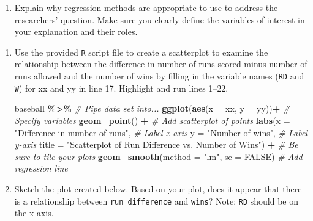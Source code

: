 \documentclass[
]{report}
\newenvironment{Shaded}{\begin{snugshade}}{\end{snugshade}}
\newcommand{\CommentTok}[1]{\textcolor[rgb]{0.56,0.35,0.01}{\textit{#1}}}
\newcommand{\DataTypeTok}[1]{\textcolor[rgb]{0.13,0.29,0.53}{#1}}
\newcommand{\KeywordTok}[1]{\textcolor[rgb]{0.13,0.29,0.53}{\textbf{#1}}}
\newcommand{\NormalTok}[1]{#1}
\newcommand{\OperatorTok}[1]{\textcolor[rgb]{0.81,0.36,0.00}{\textbf{#1}}}
\newcommand{\OtherTok}[1]{\textcolor[rgb]{0.56,0.35,0.01}{#1}}
\newcommand{\StringTok}[1]{\textcolor[rgb]{0.31,0.60,0.02}{#1}}
\providecommand{\tightlist}{%
  \setlength{\itemsep}{0pt}\setlength{\parskip}{0pt}}
\begin{document}
\begin{enumerate}
\def\labelenumi{\arabic{enumi}.}
\tightlist
\item
  Explain why regression methods are appropriate to use to address the researchers' question. Make sure you clearly define the variables of interest in your explanation and their roles.
\end{enumerate}

\newpage

\begin{enumerate}
\def\labelenumi{\arabic{enumi}.}
\setcounter{enumi}{1}
\item
  Use the provided \texttt{R} script file to create a scatterplot to examine the relationship between the difference in number of runs scored minus number of runs allowed and the number of wins by filling in the variable names (\texttt{RD} and \texttt{W}) for xx and yy in line 17. Highlight and run lines 1--22.

\begin{Shaded}
\begin{Highlighting}[]
\NormalTok{baseball }\OperatorTok{\%\textgreater{}\%}\StringTok{ }\CommentTok{\# Pipe data set into...}
\KeywordTok{ggplot}\NormalTok{(}\KeywordTok{aes}\NormalTok{(}\DataTypeTok{x =}\NormalTok{ xx, }\DataTypeTok{y =}\NormalTok{ yy))}\OperatorTok{+}\StringTok{  }\CommentTok{\# Specify variables}
\StringTok{  }\KeywordTok{geom\_point}\NormalTok{() }\OperatorTok{+}\StringTok{  }\CommentTok{\# Add scatterplot of points}
\StringTok{  }\KeywordTok{labs}\NormalTok{(}\DataTypeTok{x =} \StringTok{"Difference in number of runs"}\NormalTok{,  }\CommentTok{\# Label x{-}axis}
       \DataTypeTok{y =} \StringTok{"Number of wins"}\NormalTok{,  }\CommentTok{\# Label y{-}axis}
       \DataTypeTok{title =} \StringTok{"Scatterplot of Run Difference vs. Number of Wins"}\NormalTok{) }\OperatorTok{+}\StringTok{ }\CommentTok{\# Be sure to tile your plots}
\StringTok{  }\KeywordTok{geom\_smooth}\NormalTok{(}\DataTypeTok{method =} \StringTok{"lm"}\NormalTok{, }\DataTypeTok{se =} \OtherTok{FALSE}\NormalTok{)  }\CommentTok{\# Add regression line}
\end{Highlighting}
\end{Shaded}
\item
  Sketch the plot created below. Based on your plot, does it appear that there is a relationship between \texttt{run\ difference} and \texttt{wins}? Note: \texttt{RD} should be on the x-axis.
\end{enumerate}

\vspace{2in}
\end{document}

